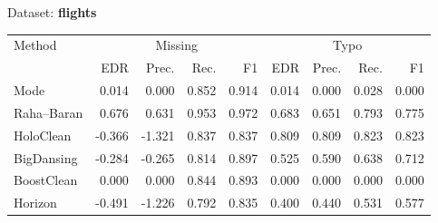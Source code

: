 \begin{subtable}[t]{0.492\linewidth}
\caption{Dataset: \textbf{flights}}
\label{tab:q1-acc-flights}
\centering
\begin{tabular}{lrrrrrrrr}
\toprule
\multirow{2}{*}{Method} &\multicolumn{4}{c}{Missing} &\multicolumn{4}{c}{Typo}\\
\cmidrule(lr){2-5}\cmidrule(l){6-9}
 & EDR & Prec. & Rec. & F1 & EDR & Prec. & Rec. & F1\\
\midrule
\midrule
Mode & 0.014 & 0.000 & 0.852 & 0.914 & 0.014 & 0.000 & 0.028 & 0.000 \\
Raha–Baran & 0.676 & 0.631 & 0.953 & 0.972 & 0.683 & 0.651 & 0.793 & 0.775 \\
HoloClean & -0.366 & -1.321 & 0.837 & 0.837 & 0.809 & 0.809 & 0.823 & 0.823 \\
BigDansing & -0.284 & -0.265 & 0.814 & 0.897 & 0.525 & 0.590 & 0.638 & 0.712 \\
BoostClean & 0.000 & 0.000 & 0.844 & 0.893 & 0.000 & 0.000 & 0.000 & 0.000 \\
Horizon & -0.491 & -1.226 & 0.792 & 0.835 & 0.400 & 0.440 & 0.531 & 0.577 \\
\bottomrule
\bottomrule
\end{tabular}
\end{subtable}